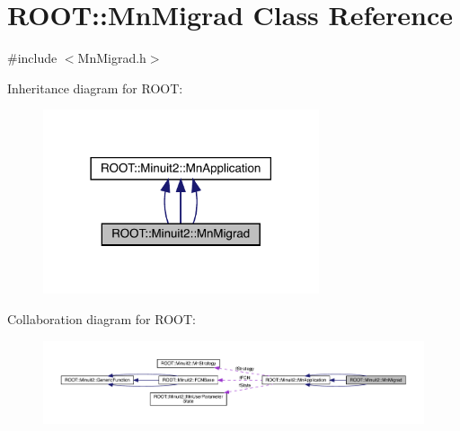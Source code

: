 \hypertarget{classROOT_1_1Minuit2_1_1MnMigrad}{}\section{R\+O\+OT\+:\+:Mn\+Migrad Class Reference}
\label{classROOT_1_1Minuit2_1_1MnMigrad}


{\ttfamily \#include $<$Mn\+Migrad.\+h$>$}



Inheritance diagram for R\+O\+OT\+:
\nopagebreak
\begin{figure}[H]
\begin{center}
\leavevmode
\includegraphics[width=230pt]{d1/d4a/classROOT_1_1Minuit2_1_1MnMigrad__inherit__graph}
\end{center}
\end{figure}


Collaboration diagram for R\+O\+OT\+:
\nopagebreak
\begin{figure}[H]
\begin{center}
\leavevmode
\includegraphics[width=350pt]{dc/d2b/classROOT_1_1Minuit2_1_1MnMigrad__coll__graph}
\end{center}
\end{figure}
